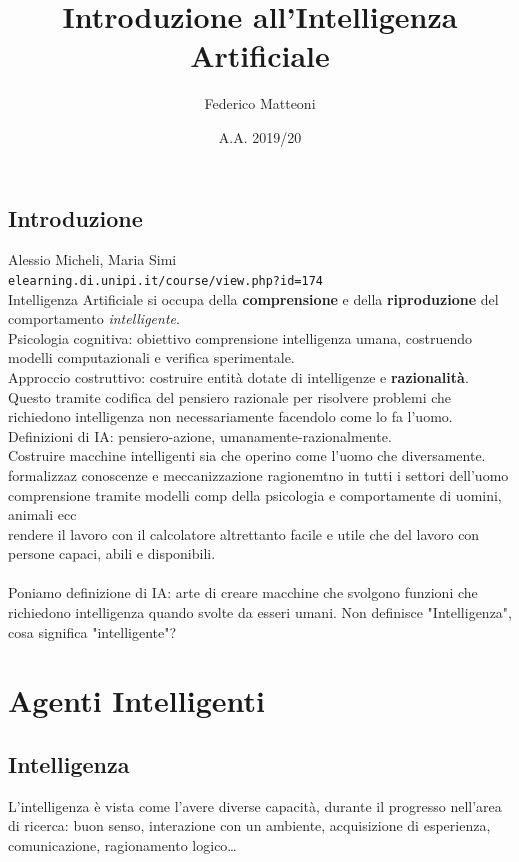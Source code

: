 \documentclass[10pt]{book}
\begin{document}
\renewcommand*\contentsname{Indice}
\title{Introduzione all'Intelligenza Artificiale}
\author{Federico Matteoni}
\date{A.A. 2019/20}
\maketitle
\tableofcontents
\pagebreak
\section*{Introduzione}
Alessio Micheli, Maria Simi\\
\texttt{elearning.di.unipi.it/course/view.php?id=174}\\
Intelligenza Artificiale si occupa della \textbf{comprensione} e della \textbf{riproduzione} del comportamento \textit{intelligente}.\\
Psicologia cognitiva: obiettivo comprensione intelligenza umana, costruendo modelli computazionali e verifica sperimentale.\\
Approccio costruttivo: costruire entità dotate di intelligenze e \textbf{razionalità}. Questo tramite codifica del pensiero razionale per risolvere problemi che richiedono intelligenza non necessariamente facendolo come lo fa l'uomo.\\
Definizioni di IA: pensiero-azione, umanamente-razionalmente.\\
Costruire macchine intelligenti sia che operino come l'uomo che diversamente.\\
formalizzaz conoscenze e meccanizzazione ragionemtno in tutti i settori dell'uomo\\
comprensione tramite modelli comp della psicologia e comportamente di uomini, animali ecc\\
rendere il lavoro con il calcolatore altrettanto facile e utile che del lavoro con persone capaci, abili e disponibili.\\\\
Poniamo definizione di IA: arte di creare macchine che svolgono funzioni che richiedono intelligenza quando svolte da esseri umani. Non definisce "Intelligenza", cosa significa "intelligente"?\\

\chapter{Agenti Intelligenti}
\section{Intelligenza}
L'intelligenza è vista come l'avere diverse capacità, durante il progresso nell'area di ricerca: buon senso, interazione con un ambiente, acquisizione di esperienza, comunicazione, ragionamento logico\ldots
\end{document}
